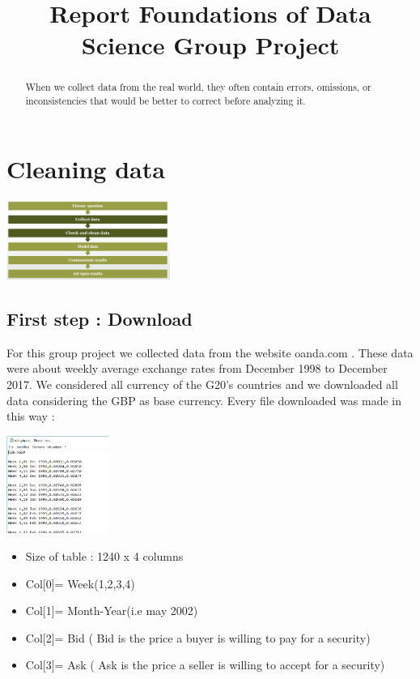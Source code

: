 \documentclass[sigconf]{acmart}
\begin{document}
\title{Report Foundations of Data Science Group Project}


\begin{abstract}

When we collect data from the real world, they often contain errors, omissions, or inconsistencies that would be better to correct before analyzing it.

\end{abstract}

\maketitle

\section{Cleaning data}

\includegraphics[width=0.40\textwidth]{aa.png}

\subsection{First step : Download } 
For this group project we collected data from the website oanda.com . These data were about weekly average exchange rates from December 1998 to December 2017. We considered all currency of the G20's countries and we downloaded all data considering the GBP as base currency. Every file downloaded was made in this way : 

\includegraphics[width=0.25\textwidth]{aaa2.png}


\begin{itemize} 
\item Size of table : 1240 x 4 columns 
\item Col[0]= Week(1,2,3,4) 
\item Col[1]= Month-Year(i.e may 2002) 
\item Col[2]= Bid ( Bid is the price a buyer is willing to pay for a security) 
\item Col[3]= Ask ( Ask is the price a seller is willing to accept for a security) 
\end{itemize}
\end{document}

